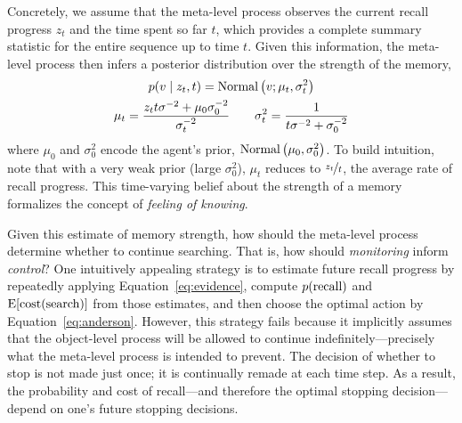 Concretely, we assume that the meta-level process observes the current recall progress $z_t$ and the time spent so far $t$, which provides a complete summary statistic for the entire sequence up to time $t$. Given this information, the meta-level process then infers a posterior distribution over the strength of the memory,
%
%
\begin{equation}\label{eq:belief}
\begin{gathered}
  p(v \mid z_t, t) = \mathrm{Normal}\left( v; \mu_t, \sigma_t^2 \right) \\
  \mu_t = \frac{z_t t \sigma^{-2} + \mu_0 \sigma_0^{-2}}{\sigma_t^{-2}} 
  \quad\quad
  \sigma^2_t = \frac{1}{t \sigma^{-2} + \sigma_0^{-2}}
\end{gathered}
\end{equation}
%
where $\mu_0$ and $\sigma_0^2$ encode the agent's prior, $\mathrm{Normal}\left( \mu_0, \sigma_0^2 \right)$. To build intuition, note that with a very weak prior (large $\sigma_0^2$), $\mu_t$ reduces to $\nicefrac{z_t}{t}$, the average rate of recall progress. This time-varying belief about the strength of a memory formalizes the concept of \emph{feeling of knowing}.

Given this estimate of memory strength, how should the meta-level process determine whether to continue searching. That is, how should \emph{monitoring} inform \emph{control}? One intuitively appealing strategy is to estimate future recall progress by repeatedly applying Equation~\ref{eq:evidence}, compute $p({\text{recall}})$ and $\operatorname*{E}[\text{cost}(\text{search})]$ from those estimates, and then choose the optimal action by Equation~\ref{eq:anderson}. However, this strategy fails because it implicitly assumes that the object-level process will be allowed to continue indefinitely---precisely what the meta-level process is intended to prevent. The decision of whether to stop is not made just once; it is continually remade at each time step. As a result, the probability and cost of recall---and therefore the optimal stopping decision---depend on one's future stopping decisions.

